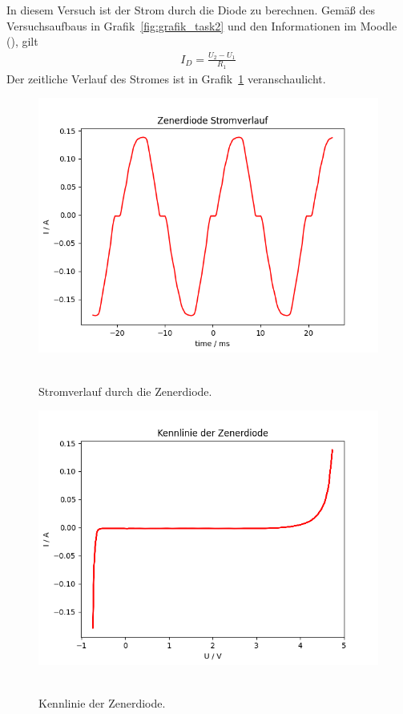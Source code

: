 \documentclass{article}
\begin{document}
In diesem Versuch ist der Strom durch die Diode zu berechnen. Gemäß des Versuchsaufbaus in Grafik~\ref{fig:grafik_task2} und den Informationen im Moodle (\cite{moodle}), gilt
\begin{align*}
I_D = \frac{U_2-U_1}{R_1}
\end{align*}
Der zeitliche Verlauf des Stromes ist in Grafik~\ref{fig:task2_auswertung1} veranschaulicht.

\begin{figure}[H]
\caption{Stromverlauf durch die Zenerdiode.}
\label{fig:task2_auswertung1}
{\centering
\includegraphics[scale=0.7]{bilder/task2_I.png}
~
}
\end{figure}




\begin{figure}[H]
\caption{Kennlinie der Zenerdiode.}
\label{fig:task2_auswertung2}
{\centering
\includegraphics[scale=0.7]{bilder/task2_IU.png}
~
}
\end{figure}
\end{document}
